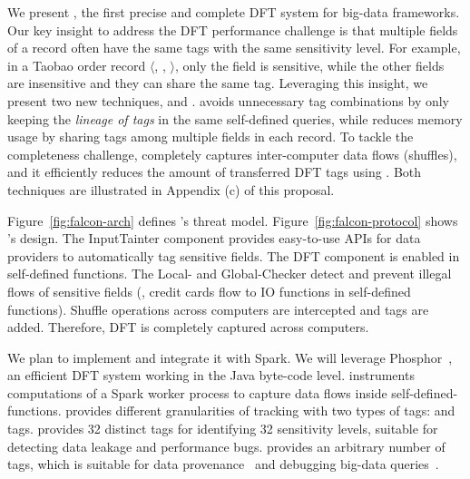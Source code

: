 We present \kakute, the first precise and complete DFT system for big-data 
frameworks. Our key insight to address the DFT performance challenge is that 
multiple fields of a record often have the same tags with the same sensitivity 
level. For example, in a Taobao order record $\langle$, 
, $\rangle$, only the  field is 
sensitive, while the other fields are insensitive and they can share the same 
tag. Leveraging this insight, we present two new techniques, \lazyp and 
\tagcache. \lazyp avoids unnecessary tag combinations by only keeping the 
\textit{lineage of tags} in the same self-defined queries, while \tagcache 
reduces memory usage by sharing tags among multiple fields in each record. To 
tackle the completeness challenge, \kakute completely captures inter-computer 
data flows (shuffles), and it efficiently reduces the amount of 
transferred DFT tags using \tagcache. Both techniques are illustrated in 
Appendix (c) of this proposal.

Figure~\ref{fig:falcon-arch} defines \kakute's threat 
model. Figure~\ref{fig:falcon-protocol} shows \kakute's design. The 
InputTainter component provides easy-to-use APIs for data providers to 
automatically tag sensitive fields. The DFT component is enabled in 
self-defined functions. The Local- and Global-Checker detect and 
prevent illegal flows of sensitive fields (\eg, credit cards flow to IO 
functions in self-defined functions). Shuffle operations across computers are 
intercepted and tags are added. Therefore, DFT is completely captured across 
computers.

We plan to implement \kakute and integrate it with Spark. We will leverage 
Phosphor~\cite{oo14:phosphor}, an efficient DFT system working in the Java 
byte-code level. \kakute instruments computations of a Spark worker process
to capture data flows inside self-defined-functions. \kakute provides different 
granularities of tracking with two types of tags: 
and  tags.  provides 32 distinct tags for 
identifying 32 sensitivity levels, suitable for detecting data leakage and 
performance bugs.  provides an arbitrary number of tags, which is 
suitable for data provenance~\cite{vldb15:titian} and 
debugging big-data queries~\cite{icse16:bigdebug}.

